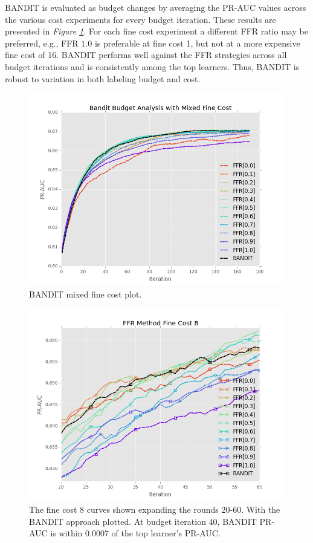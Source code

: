 \documentclass[ms]{nuthesis}
\begin{document}
BANDIT is evaluated as budget changes by averaging the PR-AUC values across the various
cost experiments for every budget iteration. These results are presented in
\textit{Figure \ref{fig:BanditMixedCostPR}}. For each fine cost experiment a different
FFR ratio may be preferred, e.g., FFR $1.0$ is preferable at fine cost 1, but not at a
more expensive fine cost of 16. BANDIT performs well against the FFR strategies across
all budget iterations and is consistently among the top learners. Thus, BANDIT is robust
to variation in both labeling budget and cost.

\FloatBarrier
\begin{figure}[!htb]
	\centering
    \includegraphics[width=1.0\columnwidth]{fig/BanditMixedCostPR}
    \caption{BANDIT mixed fine cost plot.}
    \label{fig:BanditMixedCostPR}
\end{figure}
\FloatBarrier


\FloatBarrier
\begin{figure}[!htb]
	\centering
    \includegraphics[width=1.0\columnwidth]{fig/BANDIT_PR_Cost8_rnds20_60}
    \caption{
    The fine cost 8 curves shown expanding the rounds 20-60. With the BANDIT approach
    plotted. At budget iteration 40, BANDIT PR-AUC is within $0.0007$ of the top learner's
    PR-AUC.
    }
    \label{fig:BANDIT_PR_Cost8_rnds20_60}
\end{figure}
\FloatBarrier
\end{document}
